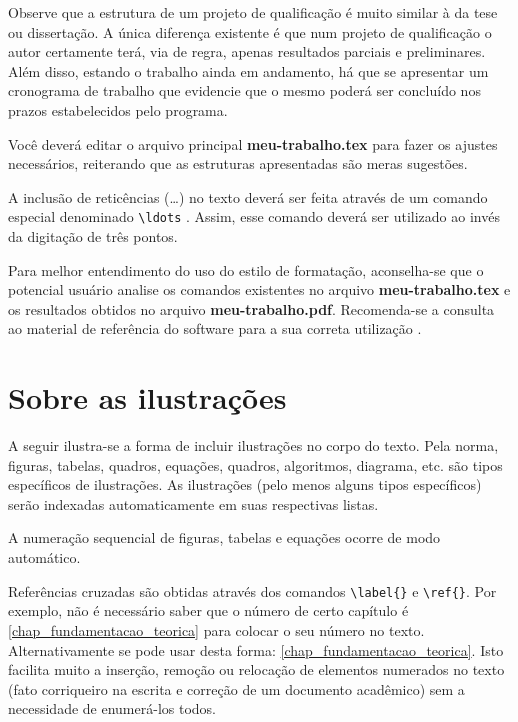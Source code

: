 \begin{apendicesenv}
    \newpage

    Observe que a estrutura de um projeto de qualificação é muito similar à da tese ou dissertação.
    A única diferença existente é que num projeto de qualificação o autor certamente terá, via de regra, apenas resultados parciais e preliminares.
    Além disso, estando o trabalho ainda em andamento, há que se apresentar um cronograma de trabalho que evidencie que o mesmo poderá ser concluído nos prazos estabelecidos pelo programa.

    Você deverá editar o arquivo principal \textbf{meu-trabalho.tex} para fazer os ajustes necessários, reiterando que as estruturas apresentadas são meras sugestões.

    A inclusão de reticências (\ldots) no texto deverá ser feita através de um comando especial denominado \verb|\ldots| \cite{LaTeX2014}.
    Assim, esse comando deverá ser utilizado ao invés da digitação de três pontos.

    Para melhor entendimento do uso do estilo de formatação, aconselha-se que o potencial usuário analise os comandos existentes no arquivo \textbf{meu-trabalho.tex} e os resultados obtidos no arquivo \textbf{meu-trabalho.pdf}.
    Recomenda-se a consulta ao material de referência do software para a sua correta utilização \cite{Lamport1986,Buerger1989,Kopka2003,Mittelbach2004}.


    \chapter{Sobre as ilustrações}
    \label{chap_sobre_as_ilustracoes}

    A seguir ilustra-se a forma de incluir ilustrações no corpo do texto.
    Pela norma, figuras, tabelas, quadros, equações, quadros, algoritmos, diagrama, etc.
    são tipos específicos de ilustrações.
    As ilustrações (pelo menos alguns tipos específicos) serão indexadas automaticamente em suas respectivas listas.

    A numeração sequencial de figuras, tabelas e equações ocorre de modo automático.

    Referências cruzadas são obtidas através dos comandos \verb|\label{}| e \verb|\ref{}|.
    Por exemplo, não é necessário saber que o número de certo capítulo é \ref{chap_fundamentacao_teorica} para colocar o seu número no texto.
    Alternativamente se pode usar desta forma: \autoref{chap_fundamentacao_teorica}.
    Isto facilita muito a inserção, remoção ou relocação de elementos numerados no texto (fato corriqueiro na escrita e correção de um documento acadêmico) sem a necessidade de enumerá-los todos.


\end{apendicesenv}
